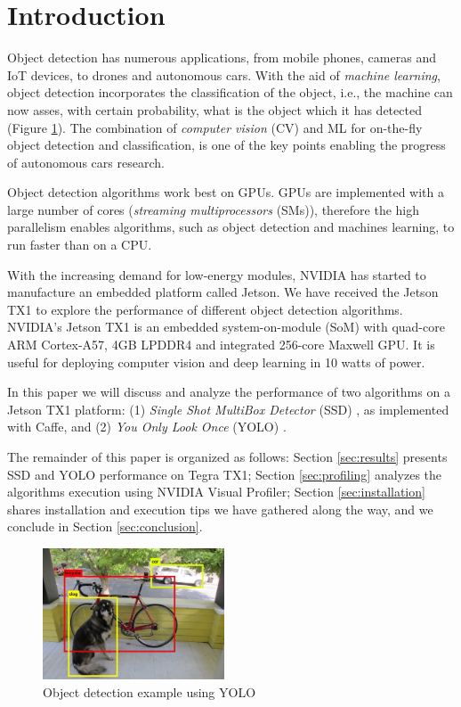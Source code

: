 \section{Introduction}
\label{sec:intro}

Object detection has numerous applications, from mobile phones, cameras and IoT devices, to drones and autonomous cars. With the aid of \textit{machine learning}, object detection incorporates the classification of the object, i.e., the machine can now asses, with certain probability, what is the object which it has detected (Figure \ref{fig:detection_example}). The combination of \textit{computer vision} (CV) and ML for on-the-fly object detection and classification, is one of the key points
enabling the progress of autonomous cars research.

Object detection algorithms work best on GPUs. GPUs are implemented with a large number of cores (\textit{streaming multiprocessors} (SMs)), therefore the high parallelism enables algorithms, such as object detection and machines learning, to run faster than on a CPU.

With the increasing demand for low-energy modules, NVIDIA has started to manufacture an embedded platform called Jetson. We have received the Jetson TX1 to explore the performance of different object detection algorithms. NVIDIA's Jetson TX1 is an embedded system-on-module (SoM) with quad-core ARM Cortex-A57, 4GB LPDDR4 and integrated 256-core Maxwell GPU. It is useful for deploying computer vision and deep learning in 10 watts of power.

In this paper we will discuss and analyze the performance of two algorithms on a Jetson TX1 platform: (1) \textit{Single Shot MultiBox Detector} (SSD) \cite{liu2016ssd}, as implemented with Caffe, and (2) \textit{You Only Look Once} (YOLO) \cite{redmon2016you}.

The remainder of this paper is organized as follows: Section \ref{sec:results} presents SSD and YOLO performance on Tegra TX1; Section \ref{sec:profiling} analyzes the algorithms execution using NVIDIA Visual Profiler; Section \ref{sec:installation} shares installation and execution tips we have gathered along the way, and we conclude in Section \ref{sec:conclusion}.

\begin{figure}[t]
	\includegraphics[width=0.48\textwidth]{./imgs/detection_example.png}
	\caption{Object detection example using YOLO}
	\label{fig:detection_example}
\end{figure}
